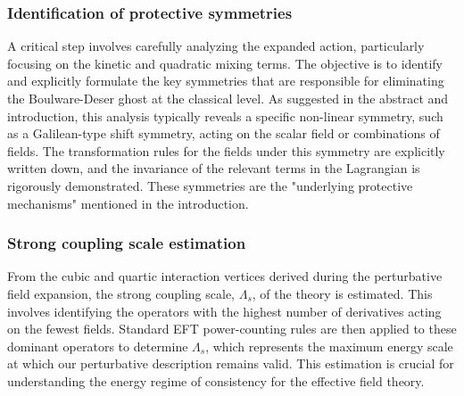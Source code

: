 \documentclass[twocolumn]{aastex631}
\begin{document}
\subsubsection{Identification of protective symmetries}
A critical step involves carefully analyzing the expanded action, particularly focusing on the kinetic and quadratic mixing terms. The objective is to identify and explicitly formulate the key symmetries that are responsible for eliminating the Boulware-Deser ghost at the classical level. As suggested in the abstract and introduction, this analysis typically reveals a specific non-linear symmetry, such as a Galilean-type shift symmetry, acting on the scalar field or combinations of fields. The transformation rules for the fields under this symmetry are explicitly written down, and the invariance of the relevant terms in the Lagrangian is rigorously demonstrated. These symmetries are the "underlying protective mechanisms" mentioned in the introduction.

\subsubsection{Strong coupling scale estimation}
From the cubic and quartic interaction vertices derived during the perturbative field expansion, the strong coupling scale, $\Lambda_s$, of the theory is estimated. This involves identifying the operators with the highest number of derivatives acting on the fewest fields. Standard EFT power-counting rules are then applied to these dominant operators to determine $\Lambda_s$, which represents the maximum energy scale at which our perturbative description remains valid. This estimation is crucial for understanding the energy regime of consistency for the effective field theory.
\end{document}
